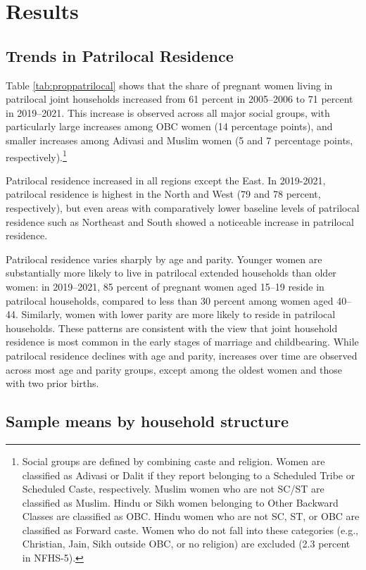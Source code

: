 \documentclass[12pt]{article}
\begin{document}
\section{Results}
\subsection{Trends in Patrilocal Residence}

Table \ref{tab:proppatrilocal} shows that the share of pregnant women living in patrilocal joint households increased from 61 percent in 2005–2006 to 71 percent in 2019–2021. This increase is observed across all major social groups, with particularly large increases among OBC women (14 percentage points), and smaller increases among Adivasi and Muslim women (5 and 7 percentage points, respectively).\footnote{Social groups are defined by combining caste and religion. Women are classified as Adivasi or Dalit if they report belonging to a Scheduled Tribe or Scheduled Caste, respectively. Muslim women who are not SC/ST are classified as Muslim. Hindu or Sikh women belonging to Other Backward Classes are classified as OBC. Hindu women who are not SC, ST, or OBC are classified as Forward caste. Women who do not fall into these categories (e.g., Christian, Jain, Sikh outside OBC, or no religion) are excluded (2.3 percent in NFHS-5).}

Patrilocal residence increased in all regions except the East. In 2019-2021, patrilocal residence is highest in the North and West (79 and 78 percent, respectively), but even areas with comparatively lower baseline levels of patrilocal residence such as Northeast and South showed a noticeable increase in patrilocal residence.  

Patrilocal residence varies sharply by age and parity. Younger women are substantially more likely to live in patrilocal extended households than older women: in 2019–2021, 85 percent of pregnant women aged 15–19 reside in patrilocal households, compared to less than 30 percent among women aged 40–44. Similarly, women with lower parity are more likely to reside in patrilocal households. These patterns are consistent with the view that joint household residence is most common in the early stages of marriage and childbearing. While patrilocal residence declines with age and parity, increases over time are observed across most age and parity groups, except among the oldest women and those with two prior births. 

\subsection{Sample means by household structure}
\end{document}
